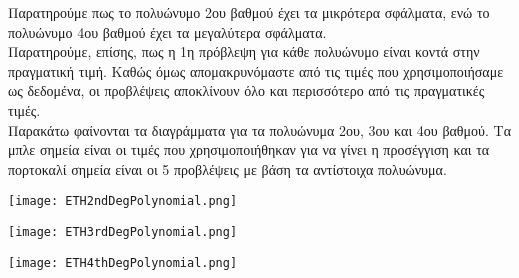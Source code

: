 \documentclass{article}
\newcommand{\gt}{\greektext}
\begin{document}
\gt
Παρατηρούμε πως το πολυώνυμο 2ου βαθμού έχει τα μικρότερα σφάλματα, ενώ το πολυώνυμο 4ου βαθμού έχει τα μεγαλύτερα σφάλματα.\\
Παρατηρούμε, επίσης, πως η 1η πρόβλεψη για κάθε πολυώνυμο είναι κοντά στην πραγματική τιμή. Καθώς όμως απομακρυνόμαστε από τις τιμές που χρησιμοποιήσαμε ως δεδομένα, οι προβλέψεις αποκλίνουν όλο και περισσότερο από τις πραγματικές τιμές.\\
Παρακάτω φαίνονται τα διαγράμματα για τα πολυώνυμα 2ου, 3ου και 4ου βαθμού. Τα μπλε σημεία είναι οι τιμές που χρησιμοποιήθηκαν για να γίνει η προσέγγιση και τα πορτοκαλί σημεία είναι οι 5 προβλέψεις με βάση τα αντίστοιχα πολυώνυμα.
\begin{center}
\texttt{[image: ETH2ndDegPolynomial.png]}
\end{center}

\begin{center}
\texttt{[image: ETH3rdDegPolynomial.png]}
\end{center}

\begin{center}
\texttt{[image: ETH4thDegPolynomial.png]}
\end{center}
\end{document}

